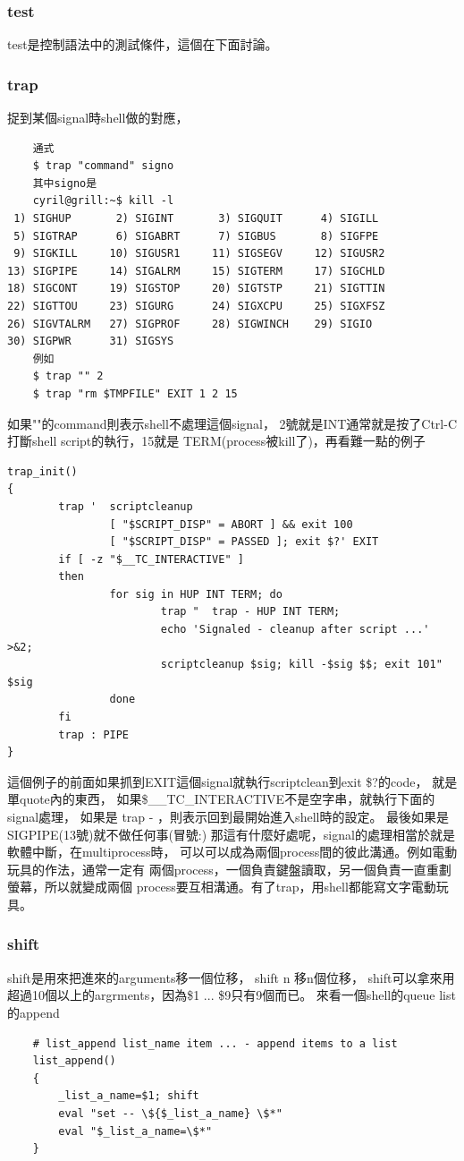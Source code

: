     \subsubsection{test}
    test是控制語法中的測試條件，這個在下面討論。
    \subsubsection{trap}
    捉到某個signal時shell做的對應，
    \begin{verbatim}
    通式
    $ trap "command" signo
    其中signo是
    cyril@grill:~$ kill -l
 1) SIGHUP       2) SIGINT       3) SIGQUIT      4) SIGILL
 5) SIGTRAP      6) SIGABRT      7) SIGBUS       8) SIGFPE
 9) SIGKILL     10) SIGUSR1     11) SIGSEGV     12) SIGUSR2
13) SIGPIPE     14) SIGALRM     15) SIGTERM     17) SIGCHLD
18) SIGCONT     19) SIGSTOP     20) SIGTSTP     21) SIGTTIN
22) SIGTTOU     23) SIGURG      24) SIGXCPU     25) SIGXFSZ
26) SIGVTALRM   27) SIGPROF     28) SIGWINCH    29) SIGIO
30) SIGPWR      31) SIGSYS
    例如
    $ trap "" 2
    $ trap "rm $TMPFILE" EXIT 1 2 15
    \end{verbatim}
    如果""的command則表示shell不處理這個signal，
    2號就是INT通常就是按了Ctrl-C打斷shell script的執行，15就是
    TERM(process被kill了)，再看難一點的例子
    \begin{verbatim}
trap_init()
{
        trap '  scriptcleanup
                [ "$SCRIPT_DISP" = ABORT ] && exit 100
                [ "$SCRIPT_DISP" = PASSED ]; exit $?' EXIT
        if [ -z "$__TC_INTERACTIVE" ]
        then
                for sig in HUP INT TERM; do
                        trap "  trap - HUP INT TERM;
                        echo 'Signaled - cleanup after script ...' >&2;
                        scriptcleanup $sig; kill -$sig $$; exit 101"  $sig
                done
        fi
        trap : PIPE
}
    \end{verbatim}
    這個例子的前面如果抓到EXIT這個signal就執行scriptclean到exit \$?的code，
    就是單quote內的東西，
    如果\$\_\_TC\_INTERACTIVE不是空字串，就執行下面的signal處理，
    如果是 trap - ，則表示回到最開始進入shell時的設定。
    最後如果是SIGPIPE(13號)就不做任何事(冒號:)
    那這有什麼好處呢，signal的處理相當於就是軟體中斷，在multiprocess時，
    可以可以成為兩個process間的彼此溝通。例如電動玩具的作法，通常一定有
    兩個process，一個負責鍵盤讀取，另一個負責一直重劃螢幕，所以就變成兩個
    process要互相溝通。有了trap，用shell都能寫文字電動玩具。

    \subsubsection{shift}
    shift是用來把進來的arguments移一個位移，
    shift n 移n個位移，
    shift可以拿來用超過10個以上的argrments，因為\$1 ... \$9只有9個而已。
    來看一個shell的queue list的append
    \begin{verbatim}
    # list_append list_name item ... - append items to a list
    list_append()
    {
        _list_a_name=$1; shift
        eval "set -- \${$_list_a_name} \$*"
        eval "$_list_a_name=\$*"
    }
    \end{verbatim}

